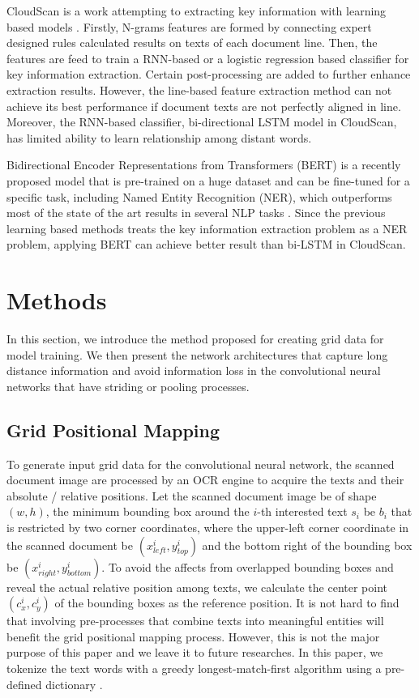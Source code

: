 \documentclass[10pt,twocolumn,letterpaper]{article}
\begin{document}
CloudScan is a work attempting to extracting key information with learning based models \cite{cloudscan}. Firstly, N-grams features are formed by connecting expert designed rules calculated results on texts of each document line. Then, the features are feed to train a RNN-based or a logistic regression based classifier for key information extraction. Certain post-processing are added to further enhance extraction results. However, the line-based feature extraction method can not achieve its best performance if document texts are not perfectly aligned in line. Moreover, the RNN-based classifier, bi-directional LSTM model in CloudScan, has limited ability to learn relationship among distant words. 

Bidirectional Encoder Representations from Transformers (BERT) is a recently proposed model that is pre-trained on a huge dataset and can be fine-tuned for a specific task, including Named Entity Recognition (NER), which outperforms most of the state of the art results in several NLP tasks \cite{bert}. Since the previous learning based methods treats the key information extraction problem as a NER problem, applying BERT can achieve better result than bi-LSTM in CloudScan.

\section{Methods}
In this section, we introduce the method proposed for creating grid data for model training. We then present the network architectures that capture long distance information and avoid information loss in the convolutional neural networks that have striding or pooling processes.

\subsection{Grid Positional Mapping}
\label{pm}
To generate input grid data for the convolutional neural network, the scanned document image are processed by an OCR engine to acquire the texts and their absolute / relative positions. Let the scanned document image be of shape $(w, h)$, the minimum bounding box around the $i$-th interested text $s_i$ be $b_i$ that is restricted by two corner coordinates, where the upper-left corner coordinate in the scanned document be $(x^i_{left}, y^i_{top})$ and the bottom right of the bounding box be $(x^i_{right}, y^i_{bottom})$. To avoid the affects from overlapped bounding boxes and reveal the actual relative position among texts, we calculate the center point $(c^i_x, c^i_y)$ of the bounding boxes as the reference position. It is not hard to find that involving pre-processes that combine texts into meaningful entities will benefit the grid positional mapping process. However, this is not the major purpose of this paper and we leave it to future researches. In this paper, we tokenize the text words with a greedy longest-match-first algorithm using a pre-defined dictionary \cite{bertgit}. 
\end{document}
